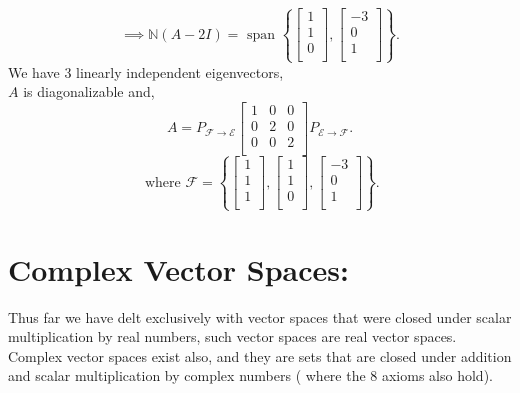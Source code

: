 \documentclass{report}
\begin{document}
{\begin{multicols}{2}
  \end{multicols}
  \[
	  \implies \mathbb{N} \left( A-2I \right) = \text{ span } \left\{ \begin{bmatrix}
	  1\\
	  1\\
	  0\\
	  \end{bmatrix}
	  , \begin{bmatrix}
	  -3\\
	  0\\
	  1\\
	  \end{bmatrix}
	   \right\} 
  .\] 
  We have 3 linearly independent eigenvectors,\\
  $ A$ is diagonalizable and, \\
  \[
  A = P _{ \mathcal{F} \to \mathcal{E}}       \begin{bmatrix}
  1 & 0 & 0\\
  0 & 2 & 0\\
  0 & 0 & 2\\
  \end{bmatrix} P _{ \mathcal{E} \to \mathcal{F}}
  .\] 
  \[
	  \text{ where } \mathcal{F} = \left\{ \begin{bmatrix}
	  1\\
	  1\\
	  1\\
	  \end{bmatrix}
	  , \begin{bmatrix}
	  1\\
	  1\\
	  0\\
	  \end{bmatrix}
	  , \begin{bmatrix}
	  -3\\
	  0\\
	  1\\
	  \end{bmatrix}
	   \right\} 
  .\] 
   }
   
   \section{Complex Vector Spaces:}
   Thus far we have delt exclusively with vector spaces  that were closed under scalar multiplication by real numbers, such vector spaces are real vector spaces. Complex vector spaces exist also, and they are sets that are closed under addition and scalar multiplication by complex numbers ( where the 8 axioms also hold).\\
\end{document}
